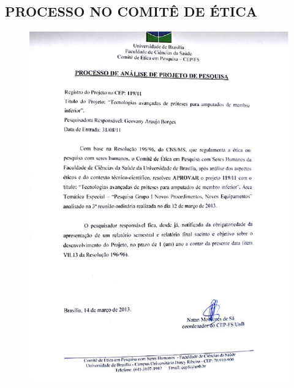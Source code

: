 \begin{anexosenv}
\partanexos
\chapter{PROCESSO NO COMITÊ DE ÉTICA}
\label{comite_sec}
\begin{figure}[ht]
	\centering
	\includegraphics[width=17cm]{figuras/comite.eps}
\label{comite}
\end{figure}
\end{anexosenv}


\printindex


